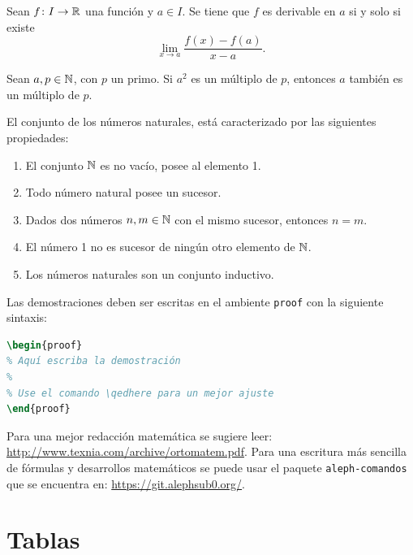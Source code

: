 \documentclass{aleph-revista}
\begin{document}
\begin{prop}
    Sean $f\colon I \rightarrow \mathbb{R}$ una función y $a\in I$. Se tiene que $f$ es derivable en $a$ si y solo si existe
    \[
        \lim_{x\to a}\frac{f(x)-f(a)}{x-a}.
    \]
\end{prop}

\begin{lem}
    Sean $a,p\in\mathbb{N}$, con $p$ un primo. Si $a^2$ es un múltiplo de $p$, entonces $a$ también es un múltiplo de $p$.
\end{lem}

\begin{axioma}
    El conjunto de los números naturales, está caracterizado por las siguientes propiedades:
    \begin{enumerate}
    \item
        El conjunto $\mathbb{N}$ es no vacío, posee al elemento 1.
    \item
        Todo número natural posee un sucesor.
    \item
        Dados dos números $n,m\in\mathbb{N}$ con el mismo sucesor, entonces $n=m$.
    \item
        El número 1 no es sucesor de ningún otro elemento de $\mathbb{N}$.
    \item
        Los números naturales son un conjunto inductivo.
    \end{enumerate}
\end{axioma}

Las demostraciones deben ser escritas en el ambiente \texttt{proof} con la siguiente sintaxis:

\begin{lstlisting}[language=TeX]
\begin{proof}
% Aquí escriba la demostración
%
% Use el comando \qedhere para un mejor ajuste
\end{proof}
\end{lstlisting}

Para una mejor redacción matemática se sugiere leer: \url{http://www.texnia.com/archive/ortomatem.pdf}. Para una escritura más sencilla de fórmulas y desarrollos matemáticos se puede usar el paquete \texttt{aleph-comandos} que se encuentra en: \url{https://git.alephsub0.org/}. 

\section{Tablas}
\end{document}

